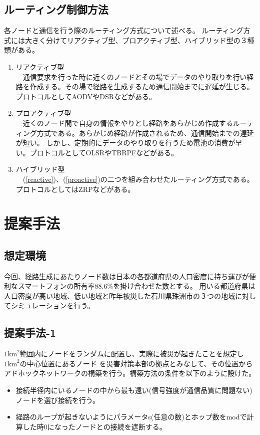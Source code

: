 \documentclass[a4paper, 10pt]{ltjsarticle}
\begin{document}
\subsection{ルーティング制御方法}
各ノードと通信を行う際のルーティング方式について述べる。
ルーティング方式には大きく分けてリアクティブ型、プロアクティブ型、ハイブリッド型の３種類がある。
\begin{enumerate}
  \item \label{reactive} リアクティブ型\\　通信要求を行った時に近くのノードとその場でデータのやり取りを行い経路を作成する。その場で経路を生成するため通信開始までに遅延が生じる。プロトコルとしてAODVやDSRなどがある。
  \item \label{proactive} プロアクティブ型\\　近くのノード間で自身の情報をやりとし経路をあらかじめ作成するルーティング方式である。あらかじめ経路が作成されるため、通信開始までの遅延が短い。
  しかし、定期的にデータのやり取りを行うため電池の消費が早い。プロトコルとしてOLSRやTBRPFなどがある。
  \item ハイブリッド型\\　(\ref{reactive})、(\ref{proactive})の二つを組み合わせたルーティング方式である。プロトコルとしてはZRPなどがある。
\end{enumerate}

\section{提案手法}
\subsection{想定環境}
今回、経路生成にあたりノード数は日本の各都道府県の人口密度に持ち運びが便利なスマートフォンの所有率88.6\%\cite{スマホ保有率}を掛け合わせた数とする。%
用いる都道府県は人口密度が高い地域、低い地域と昨年被災した石川県珠洲市の３つの地域に対してシミュレーションを行う。

\subsection{提案手法-1}
$1\mathrm{km}^2$範囲内にノードをランダムに配置し、実際に被災が起きたことを想定し$1\mathrm{km}^2$の中心位置にあるノード
を災害対策本部の拠点とみなして、その位置からアドホックネットワークの構築を行う。構築方法の条件を以下のように設けた。
\begin{itemize}
  \item 接続半径内にいるノードの中から最も遠い(信号強度が通信品質に問題ない)ノードを選び接続を行う。
  \item 経路のループが起きないようにパラメータs(任意の数)とホップ数をmodで計算した時0になったノードとの接続を遮断する。
\end{itemize}
\end{document}
